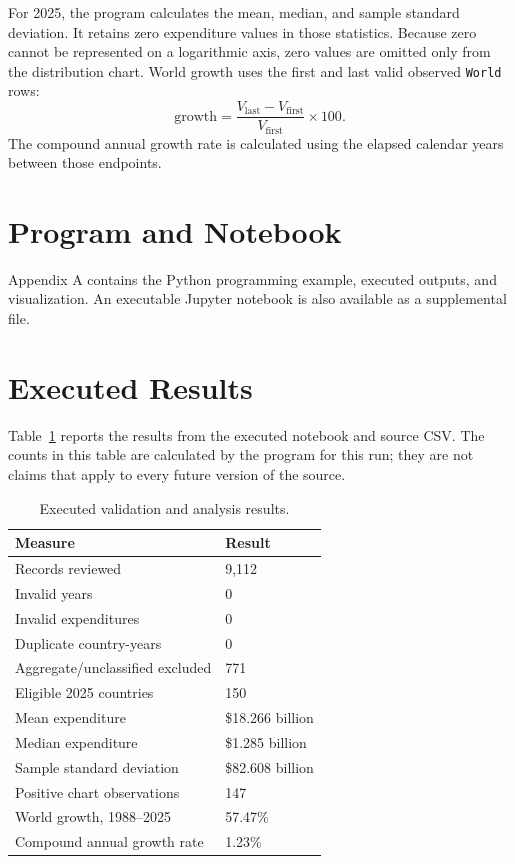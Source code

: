 \documentclass[conference]{IEEEtran}
\begin{document}
For 2025, the program calculates the mean, median, and sample standard
deviation. It retains zero expenditure values in those statistics. Because
zero cannot be represented on a logarithmic axis, zero values are omitted only
from the distribution chart. World growth uses the first and last valid
observed \texttt{World} rows:
\begin{equation}
  \text{growth} =
  \frac{V_{\mathrm{last}}-V_{\mathrm{first}}}{V_{\mathrm{first}}}
  \times 100.
\end{equation}
The compound annual growth rate is calculated using the elapsed calendar
years between those endpoints.

\section{Program and Notebook}
Appendix A contains the Python programming example, executed outputs, and
visualization. An executable Jupyter notebook is also available as a
supplemental file.

\section{Executed Results}
Table~\ref{tab:results} reports the results from the executed notebook and
source CSV. The counts in this table are calculated by the program for this
run; they are not claims that apply to every future version of the source.

\begin{table}[!t]
\centering
\caption{Executed validation and analysis results.}
\label{tab:results}
\begin{tabular}{ll}
\toprule
\textbf{Measure} & \textbf{Result}\\
\midrule
Records reviewed & 9,112\\
Invalid years & 0\\
Invalid expenditures & 0\\
Duplicate country-years & 0\\
Aggregate/unclassified excluded & 771\\
Eligible 2025 countries & 150\\
Mean expenditure & \$18.266 billion\\
Median expenditure & \$1.285 billion\\
Sample standard deviation & \$82.608 billion\\
Positive chart observations & 147\\
World growth, 1988--2025 & 57.47\%\\
Compound annual growth rate & 1.23\%\\
\bottomrule
\end{tabular}
\end{table}
\end{document}
